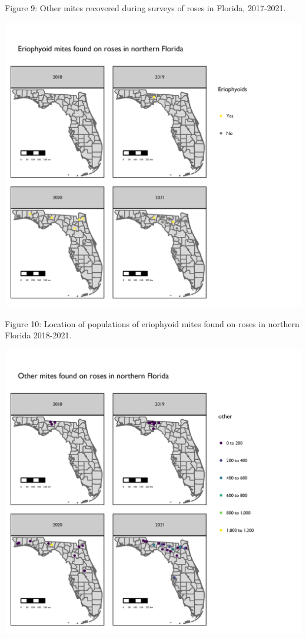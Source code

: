 \documentclass[12pt,final,CPage]{ufthesis}
\begin{document}
{  Figure 9: Other mites recovered during surveys of roses in Florida, 2017-2021.

  \pagebreak
  \begin{center}\includegraphics[width=1\linewidth]{figure/rrv_survey_map_years_pf} \end{center}

  Figure 10: Location of populations of eriophyoid mites found on roses in northern Florida 2018-2021.
  \begin{center}\includegraphics[width=1\linewidth]{figure/rrv_survey_map_years_others} \end{center}

}
\end{document}
